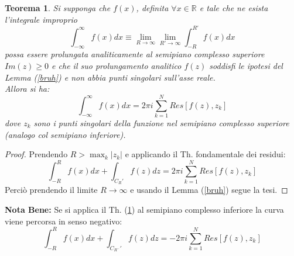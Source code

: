 \documentclass[twoside]{article}
\newtheorem{theorem}{Teorema}[section]
\begin{document}
\begin{theorem} \label{king}
Si supponga che $f(x)$, definita $\forall x \in \mathds{R}$ e tale che ne esista l'integrale improprio
\begin{equation}
    \int_{-\infty}^{\infty}f(x)dx\equiv \lim_{R\to \infty} \lim_{R' \to \infty}\int_{-R}^{R'}f(x)dx
\end{equation}
possa essere prolungata analiticamente al semipiano complesso superiore $Im(z)\ge 0$ e che il suo prolungamento analitico $f(z)$ soddisfi le ipotesi del Lemma (\ref{bruh}) e non abbia punti singolari sull'asse reale.
\\
Allora si ha:
\begin{equation}
    \int_{-\infty}^{\infty}f(x)dx=2\pi i \sum_{k=1}^N Res[f(z),z_k]
\end{equation}
dove $z_k$ sono i punti singolari della funzione nel semipiano complesso superiore (analogo col semipiano inferiore).
\end{theorem}
\begin{proof}
Prendendo $R>\max_k |z_k|$ e applicando il Th. fondamentale dei residui:
\begin{equation}
    \int_{-R}^R f(x)dx+\int_{C_R'}f(z)dz=2\pi i \sum_{k=1}^N Res[f(z),z_k]
\end{equation}
Perciò prendendo il limite $R\to \infty$ e usando il Lemma (\ref{bruh}) segue la tesi.

\end{proof}

\textbf{Nota Bene:} Se si applica il Th. (\ref{king}) al semipiano complesso inferiore la curva viene percorsa in senso negativo:
\begin{equation}
\int_{-R}^R f(x)dx + \int_{C_{R^-}'}f(z)dz=-2\pi i \sum_{k=1}^N Res[f(z),z_k]
\end{equation}
\end{document}
